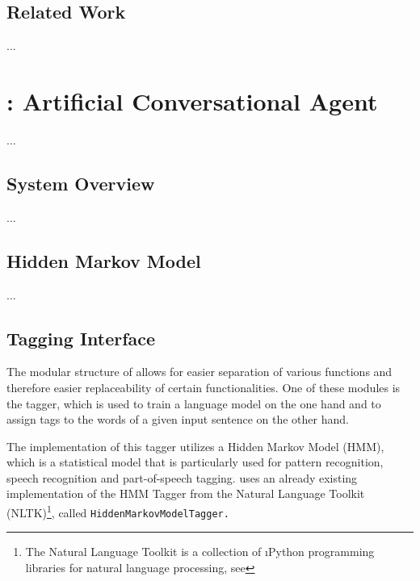 

\section{Related Work}\label{c.introduction.related}
...

\chapter{\Alex: Artificial Conversational Agent}\label{c.alex}
...

\section{System Overview}\label{c.alex.overview}
...

\section{Hidden Markov Model}\label{c.alex.hmm}
...

\section{Tagging Interface}\label{c.alex.tagging}
The modular structure of \Alex allows for easier separation of various functions and therefore easier replaceability of certain functionalities. One of these modules is the tagger, which is used to train a language model on the one hand and to assign tags to the words of a given input sentence on the other hand.

The implementation of this tagger utilizes a Hidden Markov Model (HMM), which is a statistical model that is particularly used for pattern recognition, speech recognition and part-of-speech tagging. \Alex uses an already existing implementation of the HMM Tagger from the Natural Language Toolkit (NLTK)\footnote{The Natural Language Toolkit is a collection of \i{Python} programming libraries for natural language processing, see }, called \tt{HiddenMarkovModelTagger}.

